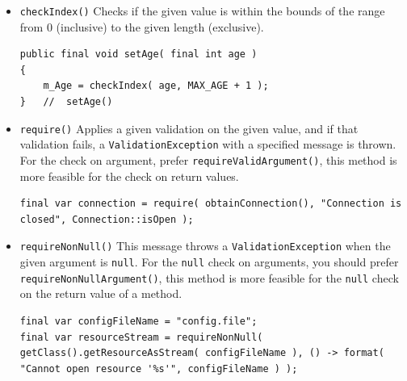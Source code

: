 \begin{itemize}
\item{\lstinline|checkIndex()|\autocite{TQUADRAT_ORG_FOUNDATION_OBJECTS:checkIndex} Checks if the given value is within the bounds of the range from 0 (inclusive) to the given length (exclusive).

\begin{lstlisting}
public final void setAge( final int age ) 
{ 
    m_Age = checkIndex( age, MAX_AGE + 1 ); 
}   //  setAge()
\end{lstlisting}}

\item{\lstinline|require()|\autocite{TQUADRAT_ORG_FOUNDATION_OBJECTS:require} Applies a given validation on the given value, and if that validation fails, a \lstinline|ValidationException| with a specified message is thrown. For the check on argument, prefer \lstinline|requireValidArgument()|\autocite{TQUADRAT_ORG_FOUNDATION_OBJECTS:requireValidArgument}, this method is more feasible for the check on return values.
\begin{lstlisting}
final var connection = require( obtainConnection(), "Connection is closed", Connection::isOpen );
\end{lstlisting}}

\item{\lstinline|requireNonNull()|\autocite{TQUADRAT_ORG_FOUNDATION_OBJECTS:requireNonNull} This message throws a \lstinline|ValidationException| when the given argument is \lstinline|null|. For the \lstinline|null| check on arguments, you should prefer \lstinline|requireNonNullArgument()|, this method is more feasible for the \lstinline|null| check on the return value of a method. 
\begin{lstlisting}
final var configFileName = "config.file";
final var resourceStream = requireNonNull( getClass().getResourceAsStream( configFileName ), () -> format( "Cannot open resource '%s'", configFileName ) );
\end{lstlisting}}


\end{itemize}
